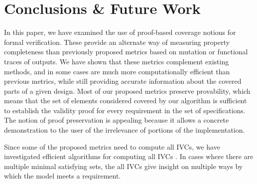 \section{Conclusions \& Future Work}
\label{sec:conclusion}

In this paper, we have examined the use of proof-based coverage notions for formal verification.  These provide an alternate way of measuring property completeness than previously proposed metrics based on mutation or functional traces of outputs.
We have shown that these metrics complement existing methods, and in some cases are much more computationally efficient than previous metrics, while still providing accurate information about the covered parts of a given design.
Most of our proposed metrics preserve provability, which means that the set of elements considered covered by our algorithm is sufficient to establish the validity proof for every requirement in the set of specifications.
The notion of proof preservation is appealing because it allows a concrete demonstration to the user of the irrelevance of portions of the implementation. 

Since some of the proposed metrics need to compute all IVCs,
we have investigated efficient algorithms for computing all IVCs \cite{Ghass17}. In cases where there are multiple minimal satisfying sets, the all IVCs give insight on multiple ways by which the model meets a requirement.


